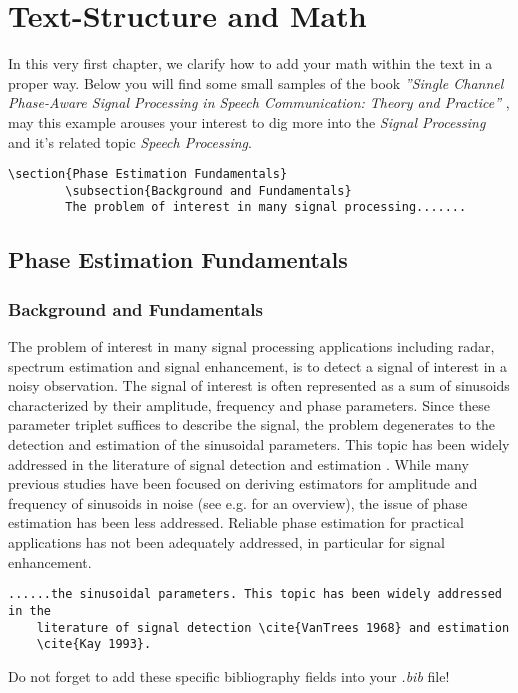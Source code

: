 \chapter{Text-Structure and Math}
In this very first chapter, we clarify how to add your math within the text in a proper way. Below you will find some small samples of the book \emph{''Single Channel Phase-Aware Signal Processing in Speech Communication: Theory and Practice''} \cite{MowlaeePejman2016}, may this example arouses your interest to dig more into the \emph{Signal Processing} and it's related topic \emph{Speech Processing}.

\begin{mdframed}
	\begin{lstlisting}[caption={Adding section and subsection}]
		\section{Phase Estimation Fundamentals}
		\subsection{Background and Fundamentals}
		The problem of interest in many signal processing.......	
	\end{lstlisting}
\end{mdframed}

\section{Phase Estimation Fundamentals}
\subsection{Background and Fundamentals}
The problem of interest in many signal processing applications including radar, spectrum estimation and signal enhancement, is to detect a signal of interest in a noisy observation. The signal of interest is often represented as a sum of sinusoids characterized by their amplitude, frequency and phase parameters. Since these parameter triplet suffices to describe the signal, the problem degenerates to the detection and estimation of the sinusoidal parameters. This topic has been widely addressed in the literature of signal detection \cite{VanTrees1968} and estimation \cite{Kay1993}. While many previous studies have been focused on deriving estimators for amplitude and frequency of sinusoids in noise (see e.g. \cite{Stoica2005} for an overview), the issue of phase estimation has been less addressed. Reliable phase estimation for practical applications has not been adequately addressed, in particular for signal enhancement.
\begin{mdframed}
	\begin{lstlisting}[caption={Add citations into your text}]
	......the sinusoidal parameters. This topic has been widely addressed in the 
	literature of signal detection \cite{VanTrees 1968} and estimation 
	\cite{Kay 1993}.
	\end{lstlisting}
	Do not forget to add these specific bibliography fields into your \emph{.bib} file!
\end{mdframed}

